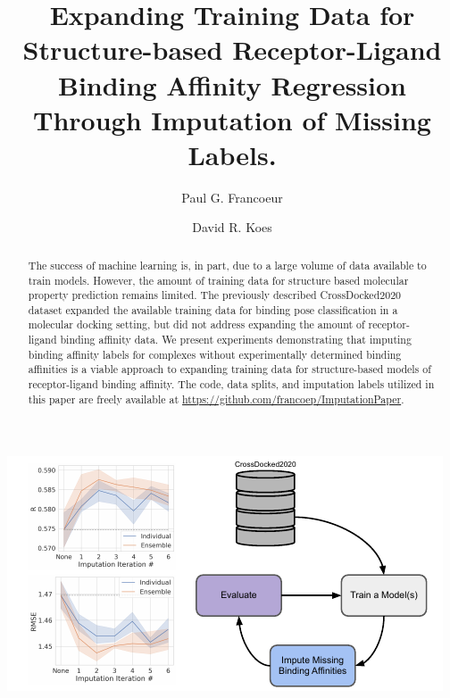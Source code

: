 \documentclass[journal=jcim,manuscript=article]{achemso}
\author{Paul G. Francoeur}
\author{David R. Koes}
\affiliation[Pitt]{Department of Computational and Systems Biology, University of Pittsburgh, Pittsburgh, PA 15260}
\title[Imputation for Binding Affinity Regression]{Expanding Training Data for Structure-based Receptor-Ligand Binding Affinity Regression Through Imputation of Missing Labels.}
\begin{document}
\begin{tocentry}




\includegraphics{figures/TOC_Imp.pdf}
\end{tocentry}

\begin{abstract}
The success of machine learning is, in part, due to a large volume of data available to train models.
However, the amount of training data for structure based molecular property prediction remains limited.
The previously described CrossDocked2020 dataset expanded the available training data for binding pose classification in a molecular docking setting, but did not address expanding the amount of receptor-ligand binding affinity data.
We present experiments demonstrating that imputing binding affinity labels for complexes without experimentally determined binding affinities is a viable approach to expanding training data for structure-based models of receptor-ligand binding affinity.
The code, data splits, and imputation labels utilized in this paper are freely available at \url{https://github.com/francoep/ImputationPaper}.
\end{abstract}
\end{document}
